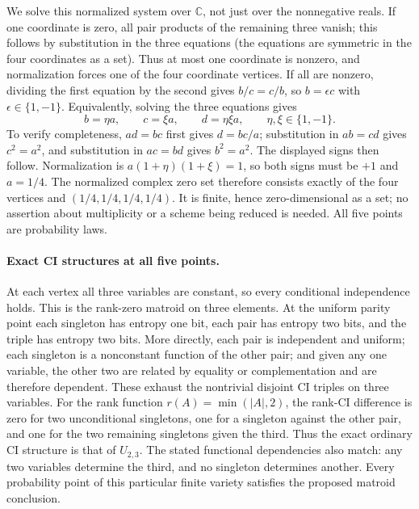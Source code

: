 \documentclass[11pt]{article}
\begin{document}
We solve this normalized system over $\mathbb C$, not just over the
nonnegative reals. If one coordinate is zero, all pair products of the
remaining three vanish; this follows by substitution in the three
equations (the equations are symmetric in the four coordinates as a
set). Thus at most one coordinate is nonzero, and normalization forces
one of the four coordinate vertices.
If all are nonzero, dividing the first equation by the second gives
$b/c=c/b$, so $b=\epsilon c$ with $\epsilon\in\{1,-1\}$.
Equivalently, solving the three equations gives
\[
b=\eta a,\qquad c=\xi a,\qquad d=\eta\xi a,
\qquad \eta,\xi\in\{1,-1\}.
\]
To verify completeness, $ad=bc$ first gives $d=bc/a$;
substitution in $ab=cd$ gives $c^2=a^2$, and substitution in
$ac=bd$ gives $b^2=a^2$. The displayed signs then follow.
Normalization is
$a(1+\eta)(1+\xi)=1$, so both signs must be $+1$ and $a=1/4$.
The normalized complex zero set therefore consists exactly of the
four vertices and $(1/4,1/4,1/4,1/4)$. It is finite, hence
zero-dimensional as a set; no assertion about multiplicity or a
scheme being reduced is needed. All five points are probability laws.

\paragraph{Exact CI structures at all five points.}
At each vertex all three variables are constant, so every conditional
independence holds. This is the rank-zero matroid on three elements.
At the uniform parity point each singleton has entropy one bit,
each pair has entropy two bits, and the triple has entropy two bits.
More directly, each pair is independent and uniform; each singleton is
a nonconstant function of the other pair; and given any one variable,
the other two are related by equality or complementation and are
therefore dependent. These exhaust the nontrivial disjoint CI triples
on three variables. For the rank function $r(A)=\min(|A|,2)$, the
rank-CI difference is zero for two unconditional singletons, one for
a singleton against the other pair, and one for the two remaining
singletons given the third. Thus the exact ordinary CI structure is
that of $U_{2,3}$. The stated functional dependencies also match: any
two variables determine the third, and no singleton determines another.
Every probability point of this particular finite variety satisfies
the proposed matroid conclusion.
\end{document}
